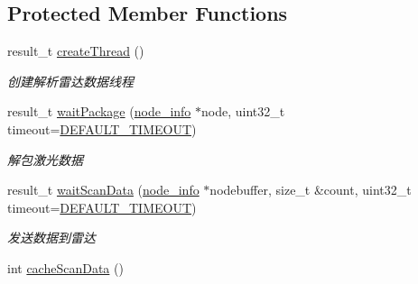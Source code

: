 \subsection*{Protected Member Functions}
\begin{DoxyCompactItemize}
\item 
result\+\_\+t \hyperlink{classydlidar_1_1_y_dlidar_driver_a2d2b317fa6381009222e03670812e917}{create\+Thread} ()
\begin{DoxyCompactList}\small\item\em 创建解析雷达数据线程 ~\newline
\end{DoxyCompactList}\item 
result\+\_\+t \hyperlink{classydlidar_1_1_y_dlidar_driver_aaf78903693f58c7f739dfa493573b3b1}{wait\+Package} (\hyperlink{structnode__info}{node\+\_\+info} $\ast$node, uint32\+\_\+t timeout=\hyperlink{classydlidar_1_1_y_dlidar_driver_a13a4f2dc4067b43794b2c47c06d5d27aa07c79ce96f468ff4b40495ef84584442}{D\+E\+F\+A\+U\+L\+T\+\_\+\+T\+I\+M\+E\+O\+UT})
\begin{DoxyCompactList}\small\item\em 解包激光数据 ~\newline
\end{DoxyCompactList}\item 
result\+\_\+t \hyperlink{classydlidar_1_1_y_dlidar_driver_a574996217284ce34191a2f3675a9f17b}{wait\+Scan\+Data} (\hyperlink{structnode__info}{node\+\_\+info} $\ast$nodebuffer, size\+\_\+t \&count, uint32\+\_\+t timeout=\hyperlink{classydlidar_1_1_y_dlidar_driver_a13a4f2dc4067b43794b2c47c06d5d27aa07c79ce96f468ff4b40495ef84584442}{D\+E\+F\+A\+U\+L\+T\+\_\+\+T\+I\+M\+E\+O\+UT})
\begin{DoxyCompactList}\small\item\em 发送数据到雷达 ~\newline
\end{DoxyCompactList}\item 
int \hyperlink{classydlidar_1_1_y_dlidar_driver_ab462b22dc3a4d39fef4f722345a87d5e}{cache\+Scan\+Data} ()\hypertarget{classydlidar_1_1_y_dlidar_driver_ab462b22dc3a4d39fef4f722345a87d5e}{}\label{classydlidar_1_1_y_dlidar_driver_ab462b22dc3a4d39fef4f722345a87d5e}


\end{DoxyCompactItemize}
